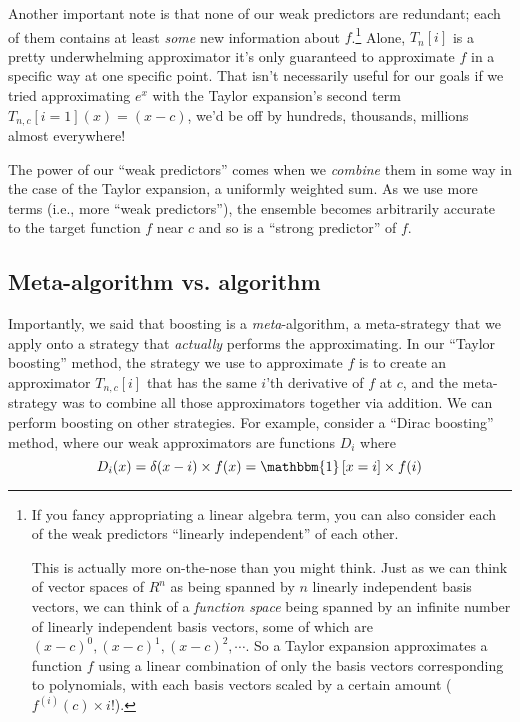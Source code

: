\documentclass[../main/main.tex]{subfiles}
\begin{document}
Another important note is that none of our weak predictors are redundant; each of them
contains at least \emph{some} new information about \(f\).\footnote{
  If you fancy appropriating a linear algebra term, you can also consider each of the weak
  predictors ``linearly independent'' of each other. 

  This is actually more on-the-nose than
  you might think. Just as we can think of vector spaces of \(R^n\) as being spanned by
  \(n\) linearly independent basis vectors, we can think of a 
  \emph{function space} being
  spanned by an infinite number of linearly independent basis vectors, some of which
  are \((x-c)^0, (x-c)^1, (x-c)^2, \cdots\). 
  So a Taylor expansion approximates a function \(f\) using a linear combination of
  only the basis vectors corresponding to polynomials, with each basis vectors scaled 
  by a certain amount (\(f^{(i)}(c) \times {i!}\)).
}
Alone, \(T_n[i]\) is a pretty underwhelming approximator \textendash{} it's only guaranteed to
approximate \(f\) in a specific way at one specific point. 
That isn't necessarily useful for our goals \textemdash{}
if we tried approximating \(e^x\) with the Taylor expansion's second term
\(T_{n,c}[i = 1](x) = (x - c)\), we'd be off by hundreds, thousands, millions almost everywhere!

The power of our ``weak predictors'' comes when we \emph{combine} them in some way 
\textemdash{} in the case of the Taylor expansion, a uniformly weighted sum. 
As we use more terms (i.e., more ``weak predictors''),
the ensemble becomes arbitrarily accurate to the target function \(f\) near \(c\) and so is
a ``strong predictor'' of \(f\).



\subsection{Meta-algorithm vs. algorithm}\label{meta-algorithm-vs-algorithm}

Importantly, we said that boosting is a \emph{meta}-algorithm, a meta-strategy that we
apply onto a strategy that \emph{actually} performs the approximating. 
In our ``Taylor boosting'' method, the strategy we use to approximate \(f\) is to create an
approximator \(T_{n,c}[i]\) that has the same \(i\)'th derivative of \(f\) at \(c\), and the
meta-strategy was to combine all those approximators together via addition. We can perform
boosting on other strategies. For example, consider a ``Dirac boosting'' method, where our
weak approximators are functions \(D_i\) where
\[D_i(x) = \delta(x-i) \times f(x) = \mathbbm{1}\left[x = i\right] \times f(i) \]
\end{document}
